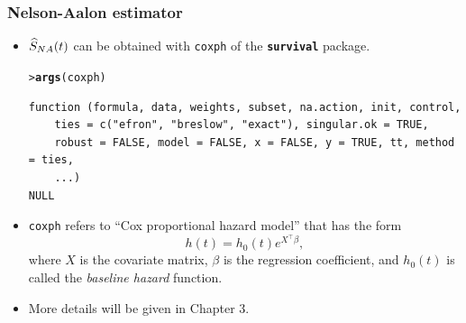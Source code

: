 \documentclass[10pt]{beamer}\usepackage[]{graphicx}\usepackage[]{color}
\makeatletter
\newcommand{\hlstd}[1]{\textcolor[rgb]{0.345,0.345,0.345}{#1}}%
\newcommand{\hlkwd}[1]{\textcolor[rgb]{0.737,0.353,0.396}{\textbf{#1}}}%
\newenvironment{kframe}{%
 \def\at@end@of@kframe{}%
 \ifinner\ifhmode%
  \def\at@end@of@kframe{\end{minipage}}%
  \begin{minipage}{\columnwidth}%
 \fi\fi%
 \def\FrameCommand##1{\hskip\@totalleftmargin \hskip-\fboxsep
 \colorbox{shadecolor}{##1}\hskip-\fboxsep
     \hskip-\linewidth \hskip-\@totalleftmargin \hskip\columnwidth}%
 \MakeFramed {\advance\hsize-\width
   \@totalleftmargin\z@ \linewidth\hsize
   \@setminipage}}%
 {\par\unskip\endMakeFramed%
 \at@end@of@kframe}
\newenvironment{knitrout}{}{} %
\renewenvironment{knitrout}{\setlength{\topsep}{-.2mm}}{}
\newcommand{\empr}[1]{{\emph{\color{red}#1}}}
\newcommand{\pkg}[1]{{\textbf{\texttt{#1}}}}
\newcommand{\code}[1]{{\texttt{#1}}}
\newcommand{\Sna}{\widehat{S}_{\scriptsize{NA}}}
\makeatother
\begin{document}
\begin{frame}[fragile]
  \frametitle{Nelson-Aalon estimator}
  \begin{itemize}
  \item $\Sna(t)$ can be obtained with \code{coxph} of the \pkg{survival} package.
\begin{knitrout}\scriptsize
{}\color{fgcolor}\begin{kframe}
\begin{alltt}
\hlstd{> }\hlkwd{args}\hlstd{(coxph)}
\end{alltt}
\begin{verbatim}
function (formula, data, weights, subset, na.action, init, control, 
    ties = c("efron", "breslow", "exact"), singular.ok = TRUE, 
    robust = FALSE, model = FALSE, x = FALSE, y = TRUE, tt, method = ties, 
    ...) 
NULL
\end{verbatim}
\end{kframe}
\end{knitrout}
  \item \code{coxph} refers to ``Cox proportional hazard model'' that has the form
    \begin{equation}
      h(t) = h_0(t) e^{X^\top\beta}, 
      \label{eq:cox}
    \end{equation}
    where $X$ is the covariate matrix, $\beta$ is the regression coefficient, 
    and $h_0(t)$ is called the \empr{baseline hazard} function.
  \item More details will be given in Chapter 3. 
  \end{itemize}
\end{frame}
\end{document}
